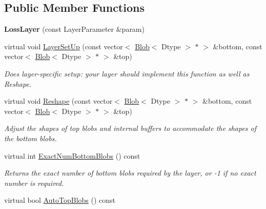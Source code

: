 \subsection*{Public Member Functions}
\begin{DoxyCompactItemize}
\item 
{\bfseries Loss\+Layer} (const Layer\+Parameter \&param)\hypertarget{classcaffe_1_1LossLayer_a16e133050e2d97c6f024ea74e3ba4ead}{}\label{classcaffe_1_1LossLayer_a16e133050e2d97c6f024ea74e3ba4ead}

\item 
virtual void \hyperlink{classcaffe_1_1LossLayer_a98084e06f7ca0e44c11aee5544379609}{Layer\+Set\+Up} (const vector$<$ \hyperlink{classcaffe_1_1Blob}{Blob}$<$ Dtype $>$ $\ast$ $>$ \&bottom, const vector$<$ \hyperlink{classcaffe_1_1Blob}{Blob}$<$ Dtype $>$ $\ast$ $>$ \&top)
\begin{DoxyCompactList}\small\item\em Does layer-\/specific setup\+: your layer should implement this function as well as Reshape. \end{DoxyCompactList}\item 
virtual void \hyperlink{classcaffe_1_1LossLayer_ab15b7120ebc172274481f3732db78c9e}{Reshape} (const vector$<$ \hyperlink{classcaffe_1_1Blob}{Blob}$<$ Dtype $>$ $\ast$ $>$ \&bottom, const vector$<$ \hyperlink{classcaffe_1_1Blob}{Blob}$<$ Dtype $>$ $\ast$ $>$ \&top)
\begin{DoxyCompactList}\small\item\em Adjust the shapes of top blobs and internal buffers to accommodate the shapes of the bottom blobs. \end{DoxyCompactList}\item 
virtual int \hyperlink{classcaffe_1_1LossLayer_a8a2e16d4691640c34e589aac4ec42e28}{Exact\+Num\+Bottom\+Blobs} () const 
\begin{DoxyCompactList}\small\item\em Returns the exact number of bottom blobs required by the layer, or -\/1 if no exact number is required. \end{DoxyCompactList}\item 
virtual bool \hyperlink{classcaffe_1_1LossLayer_ad272e6792a781ce4f66a65057cc829d1}{Auto\+Top\+Blobs} () const \hypertarget{classcaffe_1_1LossLayer_ad272e6792a781ce4f66a65057cc829d1}{}\label{classcaffe_1_1LossLayer_ad272e6792a781ce4f66a65057cc829d1}


\end{DoxyCompactItemize}
